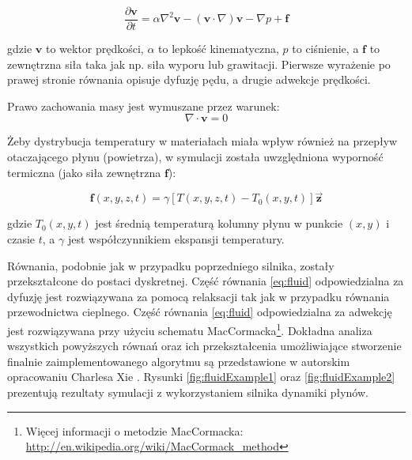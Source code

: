 \begin{equation}
\label{eq:fluid}
\frac{\partial \mathbf{v}}{\partial t}
= \alpha \nabla^2 \mathbf{v} - (\mathbf{v} \cdot \nabla) \mathbf{v} - \nabla p 
+ \mathbf{f}
\end{equation}

gdzie $\mathbf{v}$ to wektor prędkości, $\alpha$ to lepkość kinematyczna,
$p$ to ciśnienie, a $\mathbf{f}$ to zewnętrzna siła taka jak np. siła wyporu
lub grawitacji. Pierwsze wyrażenie po prawej stronie równania opisuje
dyfuzję pędu, a drugie adwekcje prędkości.

Prawo zachowania masy jest wymuszane przez warunek:
\begin{equation}
\nabla \cdot \mathbf{v} = 0
\end{equation}

Żeby dystrybucja temperatury w materiałach miała wpływ również na przepływ
otaczającego płynu (powietrza), w symulacji została uwzględniona wyporność
termiczna (jako siła zewnętrzna $\mathbf{f}$):

\begin{equation}
\mathbf{f}(x,y,z,t) = \gamma \left[ T(x,y,z,t) - T_0(x,y,t) \right] 
\mathbf{\vec{z}}
\end{equation}

gdzie $T_0(x,y,t)$ jest średnią temperaturą kolumny płynu w punkcie $(x,y)$
i czasie $t$, a $\gamma$ jest współczynnikiem ekspansji temperatury.

Równania, podobnie jak w przypadku poprzedniego silnika, zostały przekształcone
do postaci dyskretnej. Część równania \ref{eq:fluid} odpowiedzialna za dyfuzję
jest rozwiązywana za pomocą relaksacji tak jak w przypadku równania
przewodnictwa cieplnego. Część równania \ref{eq:fluid} odpowiedzialna za
adwekcję jest rozwiązywana przy użyciu schematu MacCormacka\footnote{Więcej
informacji o metodzie MacCormacka:
\url{http://en.wikipedia.org/wiki/MacCormack_method}}. Dokładna analiza
wszystkich powyższych równań oraz ich przekształcenia umożliwiające stworzenie
finalnie zaimplementowanego algorytmu są przedstawione w autorskim opracowaniu
Charlesa Xie \cite{fluidEquation}. Rysunki \ref{fig:fluidExample1} oraz
\ref{fig:fluidExample2} prezentują rezultaty symulacji z wykorzystaniem silnika
dynamiki płynów.

